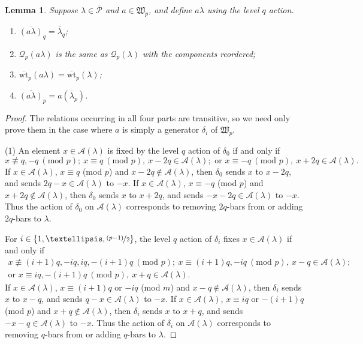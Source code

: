 \documentclass[10pt]{amsart}
\newtheorem{lemm}[prop]{Lemma}
\begin{document}
\begin{lemm}\label{lem4} 
Suppose $\lambda\in\overline{\mathcal{P}}$ and $a\in\mathfrak{W}_p$, and define $a\lambda$ using the level $q$ action. 
\begin{enumerate}
\item $\overline{(a\lambda)}_q=\overline{\lambda}_q$; 
\item $\mathcal{Q}_p(a\lambda)$ is the same as $\mathcal{Q}_p(\lambda)$ with the components reordered; 
\item $\overline{\text{wt}}_p(a\lambda)=\overline{\text{wt}}_p(\lambda)$; 
\item $\overline{(a\lambda)}_p=a(\overline{\lambda}_p)$.
\end{enumerate}
\end{lemm}
\begin{proof}
The relations occurring in all four parts are transitive, so we need only prove them in the case where $a$ is simply a generator $\delta_i$ of $\mathfrak{W}_p$. 

\smallskip
\noindent
(1) An element $x\in\mathcal{A}(\lambda)$ is fixed by the level $q$ action of $\delta_0$ if and only if 
$$x\not\equiv q,-q\:(\text{mod }p);\:x\equiv q\:(\text{mod }p),\:x-2q\in\mathcal{A}(\lambda);\text{ or }x\equiv-q\:(\text{mod }p),\:x+2q\in\mathcal{A}(\lambda).$$ 
If $x\in\mathcal{A}(\lambda)$, $x\equiv q$ (mod $p$) and $x-2q\not\in\mathcal{A}(\lambda)$, then $\delta_0$ sends $x$ to $x-2q$, and sends $2q-x\in\mathcal{A}(\lambda)$ to $-x$. If $x\in\mathcal{A}(\lambda)$, $x\equiv-q$ (mod $p$) and $x+2q\not\in\mathcal{A}(\lambda)$, then $\delta_0$ sends $x$ to $x+2q$, and sends $-x-2q\in\mathcal{A}(\lambda)$ to $-x$. Thus the action of $\delta_0$ on $\mathcal{A}(\lambda)$ corresponds to removing $2q$-bars from or adding $2q$-bars to $\lambda$. 

For $i\in\{1,\dots,\nicefrac{(p-1)}{2}\}$, the level $q$ action of $\delta_i$ fixes $x\in\mathcal{A}(\lambda)$ if and only if 
\begin{align*}x\not\equiv(i+1)q,-iq,iq,-(i+1)q\:(\text{mod }p);\:x\equiv(i+1)q,-iq\:(\text{mod }p),\:x-q\in\mathcal{A}(\lambda);\\
\text{or }x\equiv iq,-(i+1)q\:(\text{mod }p),\:x+q\in\mathcal{A}(\lambda).\end{align*} 
If $x\in\mathcal{A}(\lambda)$, $x\equiv(i+1)q$ or $-iq$ (mod $m$) and $x-q\not\in\mathcal{A}(\lambda)$, then $\delta_i$ sends $x$ to $x-q$, and sends $q-x\in\mathcal{A}(\lambda)$ to $-x$. If $x\in\mathcal{A}(\lambda)$, $x\equiv iq$ or $-(i+1)q$ (mod $p$) and $x+q\not\in\mathcal{A}(\lambda)$, then $\delta_i$ sends $x$ to $x+q$, and sends $-x-q\in\mathcal{A}(\lambda)$ to $-x$. Thus the action of $\delta_i$ on $\mathcal{A}(\lambda)$ corresponds to removing $q$-bars from or adding $q$-bars to $\lambda$. 


\end{proof}
\end{document}
